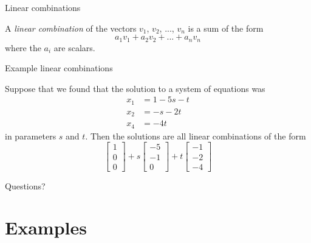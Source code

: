 \documentclass{beamer}
\begin{document}
\begin{frame}{Linear combinations}
  \begin{definition}
    A \emph{linear combination} of the vectors $v_1$, $v_2$, ..., $v_n$ is a sum of the form
    \begin{equation*}
      a_1v_1+a_2v_2+...+a_nv_n
    \end{equation*}
    where the $a_i$ are scalars.
  \end{definition}
\end{frame}

\begin{frame}{Example linear combinations}
  \begin{example}
    Suppose that we found that the solution to a system of equations was
    \begin{align*}
   x_1 &= 1-5s-t\\
    x_2 &= -s-2t\\
    x_4 &= -4t
    \end{align*}
    in parameters $s$ and $t$.
    Then the solutions are all linear combinations of the form
    \begin{equation*}
      \left[\begin{array}{r}
        1\\
        0\\
        0
      \end{array}\right]+s
      \left[\begin{array}{r}
        -5\\
        -1\\
        0
      \end{array}\right]+t
      \left[\begin{array}{r}
        -1\\
        -2\\
        -4
      \end{array}\right]
    \end{equation*}
  \end{example}
\end{frame}

\begin{frame}
  Questions?
\end{frame}

\section{Examples}
\label{sec:Examples-2}
\end{document}

